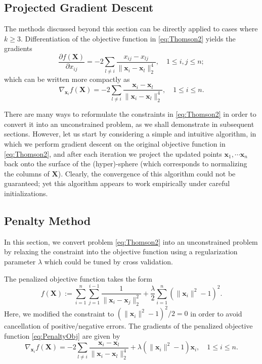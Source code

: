 \documentclass[11pt]{article}
\begin{document}
\subsection{Projected Gradient Descent}
The methods discussed beyond this section can be directly applied to cases where $k\ge3$. 
Differentiation of the objective function in \eqref{eq:Thomson2} yields the gradients
\begin{equation}
\frac{\partial f(\bm{X})}{\partial x_{ij}} = -2\sum_{l\neq i}\frac{x_{ij}-x_{lj}}{\|\bm{x}_i-\bm{x}_l\|_2^4}, \quad 1\le i,j\le n;
\end{equation}
which can be written more compactly as
\begin{equation}\label{eq:gradient}
\nabla_{\bm{x}_i} f(\bm{X}) = -2\sum_{l\neq i} \frac{\bm{x}_i-\bm{x}_l}{\|\bm{x}_i-\bm{x}_l\|_2^4}, \quad 1\le i\le n.
\end{equation}

There are many ways to reformulate the constraints in \eqref{eq:Thomson2} in order to convert it into an unconstrained problem, as we shall demonstrate in subsequent sections.
However, let us start by considering a simple and intuitive algorithm, in which we perform gradient descent on the original objective function in \eqref{eq:Thomson2}, and after each iteration we project the updated points $\bm{x}_1,\cdots\bm{x}_n$ back onto the surface of the (hyper)-sphere (which corresponds to normalizing the columns of $\bm{X}$).
Clearly, the convergence of this algorithm could not be guaranteed; yet this algorithm appears to work empirically under careful initializations.


\subsection{Penalty Method}

In this section, we convert problem \eqref{eq:Thomson2} into an unconstrained problem by relaxing the constraint into the objective function using a regularization parameter $\lambda$ which could be tuned by cross validation.

The penalized objective function takes the form
\begin{equation}\label{eq:PenaltyObj}
f(\bm{X}) := \sum_{i=1}^n\sum_{j=1}^{i-1}\frac{1}{\|\bm{x}_i-\bm{x}_j\|_2^2} + \frac{\lambda}{2} \sum_{i=1}^n \left(\|\bm{x}_i\|^2-1\right)^2.
\end{equation}
Here, we modified the constraint to $(\|\bm{x}_i\|^2-1)^2/2=0$ in order to avoid cancellation of positive/negative errors.
The gradients of the penalized objective function \eqref{eq:PenaltyObj} are given by
\begin{equation}
\nabla_{\bm{x}_i} f(\bm{X}) = -2\sum_{l\neq i} \frac{\bm{x}_i-\bm{x}_l}{\|\bm{x}_i-\bm{x}_l\|_2^4} + \lambda\left(\|\bm{x}_i\|^2-1\right)\bm{x}_i, \quad 1\le i\le n.
\end{equation}
\end{document}
